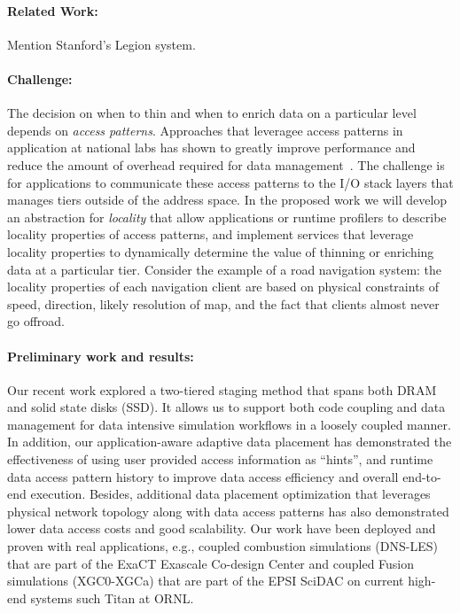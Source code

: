 \paragraph{Related Work:} Mention Stanford's Legion system.

\paragraph{Challenge:} The decision on when to thin and when to
enrich data on a particular level depends on \emph{access patterns}.
Approaches that leveragee access patterns in application at national
labs has shown to greatly improve performance and reduce the amount
of overhead required for data management~\cite{he:hpdc13}. The
challenge is for applications to communicate these access patterns
to the I/O stack layers that manages tiers outside of the address
space. In the proposed work we will develop an abstraction for
\emph{locality} that allow applications or runtime profilers to
describe locality properties of access patterns, and implement
services that leverage locality properties to dynamically determine
the value of thinning or enriching data at a particular tier.
Consider the example of a road navigation system: the locality
properties of each navigation client are based on physical constraints
of speed, direction, likely resolution of map, and the fact that
clients almost never go offroad.

\paragraph{Preliminary work and results:} Our recent work \cite{tongipdps15}
explored a two-tiered staging method that spans both DRAM and solid state
disks (SSD). It allows us to support both code coupling and data management
for data intensive simulation workflows in a loosely coupled manner. In
addition, our application-aware adaptive data placement has demonstrated the
effectiveness of using user provided access information as ``hints'', and
runtime data access pattern history to improve data access efficiency and
overall end-to-end execution. Besides, additional data placement
optimization \cite{qiansc15} that leverages physical network topology along
with data access patterns has also demonstrated lower data access costs and
good scalability. Our work have been deployed and proven with real
applications, e.g., coupled combustion simulations (DNS-LES) that are part
of the ExaCT Exascale Co-design Center and coupled Fusion simulations
(XGC0-XGCa) that are part of the EPSI SciDAC on current high-end systems
such Titan at ORNL.


